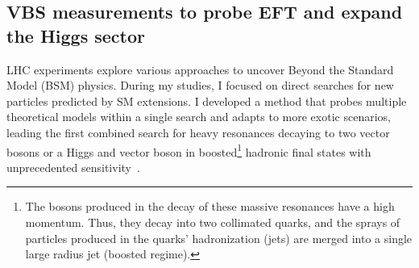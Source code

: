 {\begin{flushleft}
\vskip 10pt
\section{VBS measurements to probe EFT and expand the Higgs sector}
\vskip 5pt
LHC experiments explore various approaches to uncover Beyond the Standard Model (BSM) physics. During my studies, I focused on direct searches for new particles predicted by SM extensions. I developed a method that probes multiple theoretical models within a single search and adapts to more exotic scenarios, leading the first combined search for heavy resonances decaying to two vector bosons or a Higgs and vector boson in boosted\footnote{The bosons produced in the decay of these massive resonances have a high momentum. Thus, they decay into two collimated quarks, and the sprays of particles produced in the quarks' hadronization (jets) are merged into a single large radius jet (boosted regime).} hadronic final states with unprecedented sensitivity~\cite{[1]}. %


\end{flushleft}}
